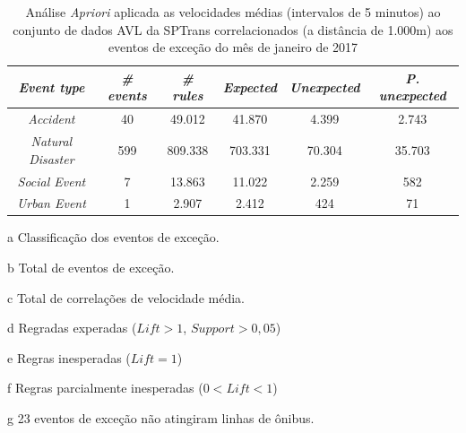 \documentclass[
	12pt,				%
	oneside,			%
	a4paper,			%
	english,			%
	brazil				%
	]{abntex2ppgsi}
\begin{document}
{{\begin{apendicesenv}
\begin{table}[!htb]
\centering
\begin{threeparttable}
\caption {Análise \textit{Apriori} aplicada as velocidades médias (intervalos de 5 minutos) ao conjunto de dados AVL da SPTrans correlacionados (a distância de 1.000m) aos eventos de exceção do mês de janeiro de 2017}
\label {tab:aprioriFull}
\begin{tabular}{c|c|c|c|c|c}
\hline
\textbf{\textit{Event type}}\tnote{a} & \textbf{\textit{\# events}}\tnote{b} & \textit{\textbf{\# rules}}\tnote{c} & \textbf{\textit{Expected}}\tnote{d} & \textbf{\textit{Unexpected}}\tnote{e} & \textbf{\textit{P. unexpected}}\tnote{f}   \\
\hline
\textit{Accident} & 40 & 49.012 & 41.870 & 4.399 & 2.743 \\
\textit{Natural Disaster} & 599 & 809.338 & 703.331 & 70.304 & 35.703 \\
\textit{Social Event} & 7 & 13.863 & 11.022 & 2.259 & 582 \\
\textit{Urban Event} & 1 & 2.907 & 2.412 & 424 & 71 \\
\hline
\end{tabular}
\begin{tablenotes}
            \item[a] Classificação dos eventos de exceção.
            \item[b] Total de eventos de exceção.
            \item[c] Total de correlações de velocidade média.
            \item[d] Regradas experadas ($Lift > 1$, $Support > 0,05$)
            \item[e] Regras inesperadas ($Lift = 1$)
            \item[f] Regras parcialmente inesperadas ($0 < Lift < 1$)
            \item[g] 23 eventos de exceção não atingiram linhas de ônibus. 
        \end{tablenotes}
\end{threeparttable}
\end{table}


\end{apendicesenv}}}
\end{document}
